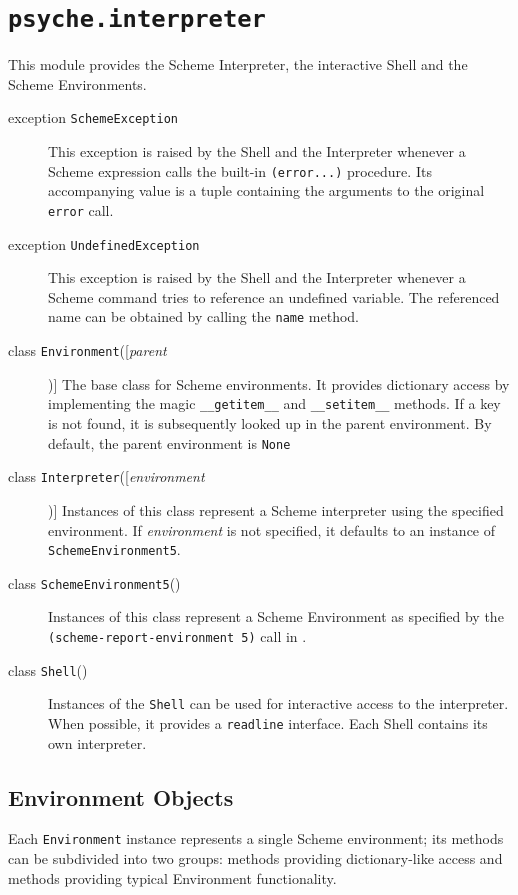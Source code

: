 \documentclass{report}
\newcommand{\code}[1]{\texttt{#1}}
\newcommand{\file}[1]{\texttt{#1}}
\newcommand{\exception}[1]{exception \code{#1}}
\newcommand{\class}[1]{class \code{#1}}
\newcommand{\param}[1]{\textmd{\textit{#1}}}
\newcommand{\opt}[1]{[\textmd{\textit{#1}}]}
\begin{document}
\chapter{\code{psyche.interpreter}}
\label{chap:psyche.interpreter}
This module provides the Scheme Interpreter, the interactive Shell and
the Scheme Environments. 

\begin{description}

\item[\exception{SchemeException}] This exception is raised
by the Shell and the Interpreter whenever a Scheme expression calls
the built-in \code{(error...)} procedure. Its accompanying value is a
tuple containing the arguments to the original \code{error} call. 

\item[\exception{UndefinedException}] This exception is raised by
the Shell and the Interpreter whenever a Scheme command tries to
reference an undefined variable. The referenced name can be obtained
by calling the \code{name} method.

\item[\class{Environment}(\opt{parent})] The base class for
Scheme environments. It provides dictionary access by implementing the
magic \code{\_\_getitem\_\_} and \code{\_\_setitem\_\_} methods. If a
key is not found, it is subsequently looked up in the parent
environment. By default, the parent environment is \code{None}

\item[\class{Interpreter}(\opt{environment})] Instances of this class
represent a Scheme interpreter using the specified environment. If
\param{environment} is not specified, it defaults to an instance of
\code{SchemeEnvironment5}.

\item[\class{SchemeEnvironment5}()] Instances of this class represent a
Scheme Environment as specified by the
\code{(scheme-report-environment 5)} call in \cite{r5rs}.

\item[\class{Shell}()] Instances of the \code{Shell} can be used for
interactive access to the interpreter. When possible, it provides a
\file{readline} interface. Each Shell contains its own interpreter. 

\end{description}


\section{Environment Objects}
Each \code{Environment} instance represents a single Scheme
environment; its methods can be subdivided into two groups: methods
providing dictionary-like access and methods providing typical
Environment functionality.
\end{document}
